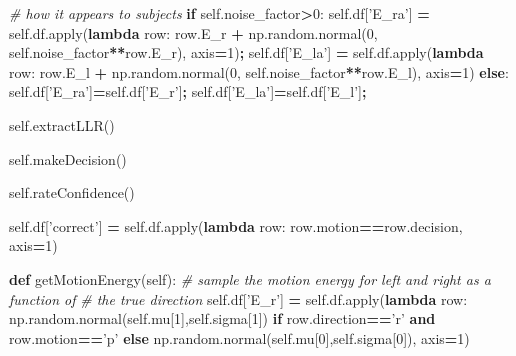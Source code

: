 \documentclass[12pt,twoside]{reedthesis}
\newenvironment{Shaded}{\begin{snugshade}}{\end{snugshade}}
\newcommand{\BuiltInTok}[1]{#1}
\newcommand{\CommentTok}[1]{\textcolor[rgb]{0.56,0.35,0.01}{\textit{#1}}}
\newcommand{\ControlFlowTok}[1]{\textcolor[rgb]{0.13,0.29,0.53}{\textbf{#1}}}
\newcommand{\DecValTok}[1]{\textcolor[rgb]{0.00,0.00,0.81}{#1}}
\newcommand{\KeywordTok}[1]{\textcolor[rgb]{0.13,0.29,0.53}{\textbf{#1}}}
\newcommand{\NormalTok}[1]{#1}
\newcommand{\OperatorTok}[1]{\textcolor[rgb]{0.81,0.36,0.00}{\textbf{#1}}}
\newcommand{\StringTok}[1]{\textcolor[rgb]{0.31,0.60,0.02}{#1}}
\newcommand{\VariableTok}[1]{\textcolor[rgb]{0.00,0.00,0.00}{#1}}
\begin{document}
\begin{Shaded}
\begin{Highlighting}[]
        \CommentTok{# how it appears to subjects}
        \ControlFlowTok{if} \VariableTok{self}\NormalTok{.noise_factor}\OperatorTok{>}\DecValTok{0}\NormalTok{:}
          \VariableTok{self}\NormalTok{.df[}\StringTok{'E_ra'}\NormalTok{] }\OperatorTok{=} \VariableTok{self}\NormalTok{.df.}\BuiltInTok{apply}\NormalTok{(}\KeywordTok{lambda}\NormalTok{ row: row.E_r }\OperatorTok{+}
\NormalTok{                        np.random.normal(}\DecValTok{0}\NormalTok{, }\VariableTok{self}\NormalTok{.noise_factor}\OperatorTok{**}\NormalTok{row.E_r), }
\NormalTok{                        axis}\OperatorTok{=}\DecValTok{1}\NormalTok{)}\OperatorTok{;}
          \VariableTok{self}\NormalTok{.df[}\StringTok{'E_la'}\NormalTok{] }\OperatorTok{=} \VariableTok{self}\NormalTok{.df.}\BuiltInTok{apply}\NormalTok{(}\KeywordTok{lambda}\NormalTok{ row: row.E_l }\OperatorTok{+}
\NormalTok{                        np.random.normal(}\DecValTok{0}\NormalTok{, }\VariableTok{self}\NormalTok{.noise_factor}\OperatorTok{**}\NormalTok{row.E_l), }
\NormalTok{                        axis}\OperatorTok{=}\DecValTok{1}\NormalTok{)}
        \ControlFlowTok{else}\NormalTok{:}
          \VariableTok{self}\NormalTok{.df[}\StringTok{'E_ra'}\NormalTok{]}\OperatorTok{=}\VariableTok{self}\NormalTok{.df[}\StringTok{'E_r'}\NormalTok{]}\OperatorTok{;}
          \VariableTok{self}\NormalTok{.df[}\StringTok{'E_la'}\NormalTok{]}\OperatorTok{=}\VariableTok{self}\NormalTok{.df[}\StringTok{'E_l'}\NormalTok{]}\OperatorTok{;}

        \VariableTok{self}\NormalTok{.extractLLR()}

        \VariableTok{self}\NormalTok{.makeDecision()}

        \VariableTok{self}\NormalTok{.rateConfidence()}
        
        \VariableTok{self}\NormalTok{.df[}\StringTok{'correct'}\NormalTok{] }\OperatorTok{=} 
          \VariableTok{self}\NormalTok{.df.}\BuiltInTok{apply}\NormalTok{(}\KeywordTok{lambda}\NormalTok{ row: }
\NormalTok{            row.motion}\OperatorTok{==}\NormalTok{row.decision, axis}\OperatorTok{=}\DecValTok{1}\NormalTok{)}

    \KeywordTok{def}\NormalTok{ getMotionEnergy(}\VariableTok{self}\NormalTok{):}
    \CommentTok{# sample the motion energy for left and right as a function of }
    \CommentTok{# the true direction}
        \VariableTok{self}\NormalTok{.df[}\StringTok{'E_r'}\NormalTok{] }\OperatorTok{=} \VariableTok{self}\NormalTok{.df.}\BuiltInTok{apply}\NormalTok{(}\KeywordTok{lambda}\NormalTok{ row: }
\NormalTok{               np.random.normal(}\VariableTok{self}\NormalTok{.mu[}\DecValTok{1}\NormalTok{],}\VariableTok{self}\NormalTok{.sigma[}\DecValTok{1}\NormalTok{]) }
               \ControlFlowTok{if}\NormalTok{ row.direction}\OperatorTok{==}\StringTok{'r'} \KeywordTok{and}\NormalTok{ row.motion}\OperatorTok{==}\StringTok{'p'}
               \ControlFlowTok{else}\NormalTok{ np.random.normal(}\VariableTok{self}\NormalTok{.mu[}\DecValTok{0}\NormalTok{],}\VariableTok{self}\NormalTok{.sigma[}\DecValTok{0}\NormalTok{]),}
\NormalTok{               axis}\OperatorTok{=}\DecValTok{1}\NormalTok{)}


\end{Highlighting}
\end{Shaded}
\end{document}
